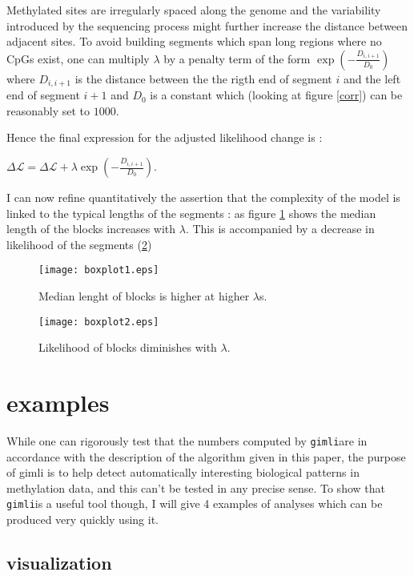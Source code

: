 \documentclass[11pt]{amsart}
\newcommand{\lik}{\ensuremath{\mathcal{L}}}
\newcommand{\gimli}{\texttt{gimli}}
\begin{document}
Methylated sites are irregularly spaced along the genome and the variability 
introduced by the sequencing process might further increase the distance 
between adjacent sites.
To avoid building segments which span long regions where no CpGs exist, one 
can multiply $\lambda$ by a penalty term of the
form $\exp(-\frac{D_{i,i+1}}{D_0})$ where $D_{i,i+1}$ is the distance 
between the the rigth end of segment $i$ and the left end of segment $i+1$ and 
$D_0$ is a constant which (looking at figure \ref{corr}) can be reasonably 
set to $1000$. 

Hence the final expression for the adjusted likelihood change is :

$\Delta \lik = \Delta \lik+\lambda \exp(-\frac{D_{i,i+1}}{D_0}) $.

I can now refine quantitatively the assertion that the complexity of the model
is linked to the typical lengths of the segments : as figure \ref{boxplot1} 
shows the median length of the blocks increases with $\lambda$. This is 
accompanied by a decrease in likelihood of the segments (\ref{boxplot2})

\begin{figure}\label{boxplot1}
\texttt{[image: boxplot1.eps]}
\caption{Median lenght of blocks is higher at higher $\lambda$s.}
\end{figure}

\begin{figure}\label{boxplot2}
\texttt{[image: boxplot2.eps]}
\caption{Likelihood of blocks diminishes with $\lambda$.}
\end{figure}

\section{examples}

While one can rigorously test that the numbers computed by \gimli are in 
accordance with the description
of the algorithm given in this paper, the purpose of gimli is to help 
detect automatically interesting
biological patterns in methylation data, and this can't be tested in any 
precise sense. To show that \gimli is a useful tool
though, I will give 4 examples of analyses which can be produced very quickly
using it. 

\subsection{visualization}
\end{document}
